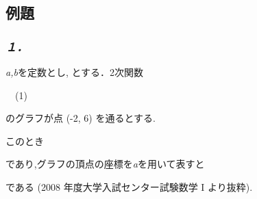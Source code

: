 \documentclass{article}
\begin{document}
\subsection{\textbf{例題}}
\subsubsection{\textbf{\textit{１．}}}
\begin{maplegroup}
\begin{Maple Normal}{
\textit{a,b}を定数とし,
とする．2次関数}\end{Maple Normal}

\begin{center}
\begin{Maple Normal}{
　(1)}\end{Maple Normal}
\end{center}
\begin{Maple Normal}{
のグラフが点 (-2, 6) を通るとする.}\end{Maple Normal}

\begin{Maple Normal}{
このとき}\end{Maple Normal}

\begin{center}
\begin{Maple Normal}{
}\end{Maple Normal}
\end{center}
\begin{Maple Normal}{
であり,グラフの頂点の座標を\textit{a}を用いて表すと}\end{Maple Normal}

\begin{center}
\begin{Maple Normal}{
}\end{Maple Normal}
\end{center}
\begin{Maple Normal}{
である (2008 年度大学入試センター試験数学 I より抜粋).}\end{Maple Normal}
\end{maplegroup}
\end{document}
